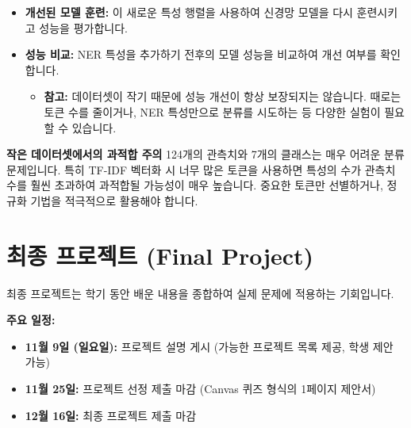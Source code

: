 \documentclass[11pt,a4paper]{article}
\theoremstyle{definition}
\begin{document}
\begin{enumerate}
\begin{itemize}
                \begin{itemize}
                    \item 0: 해당 개체가 문서에 없음
                    \item 1: 해당 개체가 문서에 한 번 이상 존재함
                \end{itemize}
            \textbf{특성 행렬 결합:} 기존 TF-IDF 특성 행렬에 NER에서 생성된 이진 더미 변수들을 추가하여 새로운 종합 특성 행렬을 만듭니다.
            \item \textbf{개선된 모델 훈련:} 이 새로운 특성 행렬을 사용하여 신경망 모델을 다시 훈련시키고 성능을 평가합니다.
            \item \textbf{성능 비교:} NER 특성을 추가하기 전후의 모델 성능을 비교하여 개선 여부를 확인합니다.
                \begin{itemize}
                    \item \textbf{참고:} 데이터셋이 작기 때문에 성능 개선이 항상 보장되지는 않습니다. 때로는 토큰 수를 줄이거나, NER 특성만으로 분류를 시도하는 등 다양한 실험이 필요할 수 있습니다.
                \end{itemize}
        \end{itemize}
\end{enumerate}

\begin{warningbox}
\textbf{작은 데이터셋에서의 과적합 주의}
124개의 관측치와 7개의 클래스는 매우 어려운 분류 문제입니다. 특히 TF-IDF 벡터화 시 너무 많은 토큰을 사용하면 특성의 수가 관측치 수를 훨씬 초과하여 과적합될 가능성이 매우 높습니다. 중요한 토큰만 선별하거나, 정규화 기법을 적극적으로 활용해야 합니다.
\end{warningbox}

\newpage
\section{최종 프로젝트 (Final Project)}
최종 프로젝트는 학기 동안 배운 내용을 종합하여 실제 문제에 적용하는 기회입니다.

\textbf{주요 일정:}
\begin{itemize}
    \item \textbf{11월 9일 (일요일):} 프로젝트 설명 게시 (가능한 프로젝트 목록 제공, 학생 제안 가능)
    \item \textbf{11월 25일:} 프로젝트 선정 제출 마감 (Canvas 퀴즈 형식의 1페이지 제안서)
    \item \textbf{12월 16일:} 최종 프로젝트 제출 마감
\end{itemize}
\end{document}
